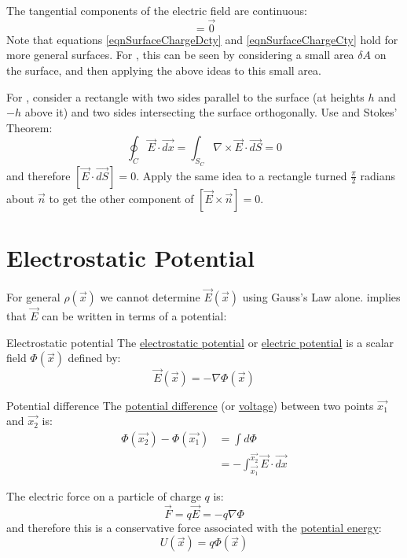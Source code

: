 \documentclass[../Main.tex]{subfiles}
\begin{document}
The tangential components of the electric field are continuous:
\begin{equation}
    [\vec{n} \times \vec{E}] = \vec0
    \label{eqnSurfaceChargeCty}
\end{equation}
Note that equations \ref{eqnSurfaceChargeDcty} and \ref{eqnSurfaceChargeCty} hold for more general surfaces. For , this can be seen by considering a small area $\delta A$ on the surface, and then applying the above ideas to this small area.

For , consider a rectangle with two sides parallel to the surface (at heights $h$ and $-h$ above it) and two sides intersecting the surface orthogonally.
Use  and Stokes' Theorem:
\begin{equation*}
    \oint_C \vec{E} \cdot \vec{dx} = \int_{S_C} \nabla \times \vec{E} \cdot \vec{dS} = 0
\end{equation*}
and therefore $[\vec{E}\cdot \vec{dS}] = 0$. Apply the same idea to a rectangle turned $\frac\pi2$ radians about $\vec{n}$ to get the other component of $[\vec{E} \times \vec{n}] = 0$.
\section{Electrostatic Potential}
For general $\rho(\vec{x})$ we cannot determine $\vec{E}(\vec{x})$ using Gauss's Law alone.  implies that $\vec{E}$ can be written in terms of a potential:
\begin{definition}{Electrostatic potential}
    The \underline{electrostatic potential} or \underline{electric potential} is a scalar field $\Phi(\vec{x})$ defined by:
    \begin{equation}
        \vec{E}(\vec{x}) = - \nabla \Phi(\vec{x})
        \label{eqnElecPotDef}
    \end{equation}
\end{definition}
\begin{definition}{Potential difference}
    The \underline{potential difference} (or \underline{voltage}) between two points $\vec{x_1}$ and $\vec{x_2}$ is:
    \begin{align*}
        \Phi(\vec{x_2}) - \Phi(\vec{x_1}) &= \int d\Phi \\
        &= -\int_{\vec{x_1}}^{\vec{x_{2}}} \vec{E} \cdot \vec{dx}
    \end{align*}
\end{definition}
The electric force on a particle of charge $q$ is:
\begin{equation*}
    \vec{F} = q\vec{E} = -q \nabla \Phi
\end{equation*}
and therefore this is a conservative force associated with the \underline{potential energy}:
\begin{equation*}
    U(\vec{x}) = q\Phi(\vec{x})
\end{equation*}
\end{document}
